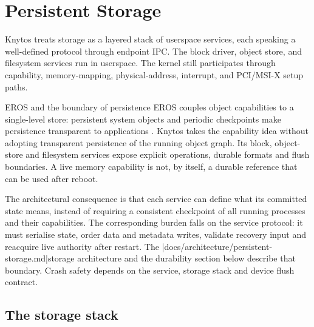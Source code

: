 \chapter{Persistent Storage}
\label{chap:storage}

Knytos treats storage as a layered stack of userspace services, each
speaking a well-defined protocol through endpoint IPC. The block driver,
object store, and filesystem services run in userspace. The kernel still
participates through capability, memory-mapping, physical-address, interrupt,
and PCI/MSI-X setup paths.

\begin{architecturalcomparison}{EROS and the boundary of persistence}
EROS couples object capabilities to a single-level store: persistent system
objects and periodic checkpoints make persistence transparent to applications
\cite{prior:eros}. Knytos takes the capability idea without adopting
transparent persistence of the running object graph. Its block, object-store
and filesystem services expose explicit operations, durable formats and flush
boundaries. A live memory capability is not, by itself, a durable reference
that can be used after reboot.

The architectural consequence is that each service can define what its
committed state means, instead of requiring a consistent checkpoint of all
running processes and their capabilities. The corresponding burden falls on
the service protocol: it must serialise state, order data and metadata writes,
validate recovery input and reacquire live authority after restart. The
\repofiletext|docs/architecture/persistent-storage.md|{storage architecture}
and the durability section below describe that boundary. Crash safety depends
on the service, storage stack and device flush contract.
\end{architecturalcomparison}

\section{The storage stack}

